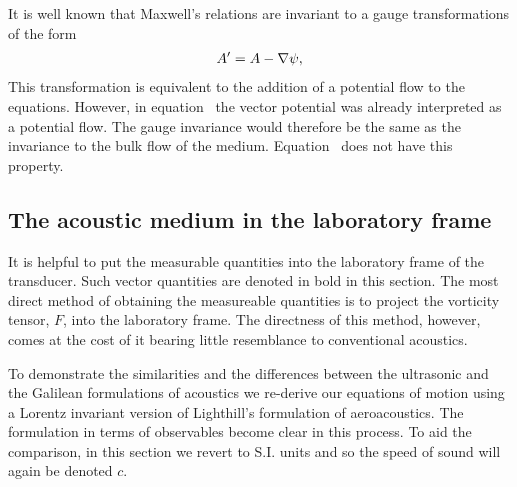 It is well known that Maxwell's relations are invariant to a gauge transformations of the form
\begin{align}
A^\prime = A - \nabla \psi,
\end{align}
This transformation is equivalent to the addition of a potential flow to the equations.
However, in equation~ the vector potential was already interpreted as a potential flow.
The gauge invariance would therefore be the same as the  invariance to the bulk flow of the medium.
Equation~ does not have this property.






\subsection{The acoustic medium in the laboratory frame}\label{sec:int:EM}

It is helpful to put the measurable quantities into the laboratory frame of the transducer.
Such vector quantities are denoted in bold in this section.
The most direct method of obtaining the measureable quantities
is to project the vorticity tensor, $F$, into the laboratory  frame\cite{Hestenes2003, Doran2003}.
The directness of this method, however, comes at the cost of it bearing little  resemblance to conventional acoustics.

To demonstrate the similarities and the differences between  the ultrasonic and the Galilean  formulations of acoustics
we re-derive our equations of motion using a Lorentz invariant version of Lighthill's formulation of aeroacoustics\cite{Lighthill1952}.
The formulation in terms of observables  become clear in this process.
To aid the comparison, in this section we revert to S.I. units and so the speed of sound will again be denoted $c$.


